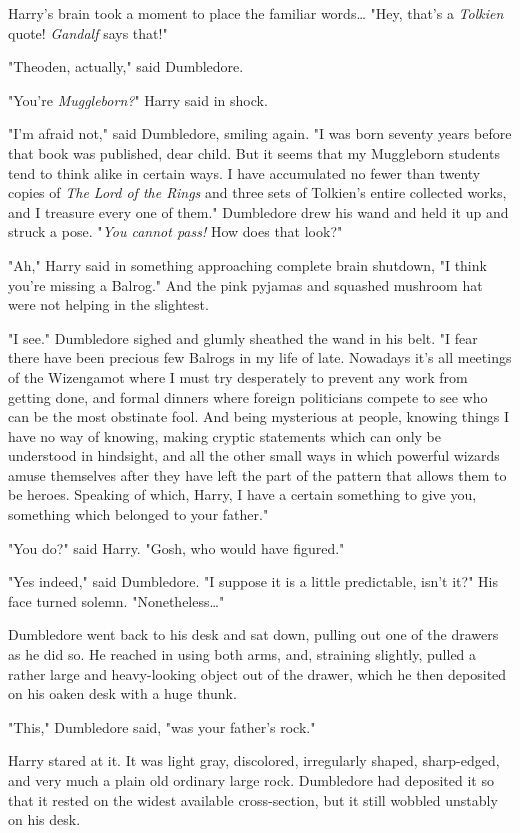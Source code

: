 Harry's brain took a moment to place the familiar words{\ldots} "Hey, that's a 
\emph{Tolkien} quote! \emph{Gandalf} says that!"

"Theoden, actually," said Dumbledore.

"You're \emph{Muggleborn?}" Harry said in shock.

"I'm afraid not," said Dumbledore, smiling again. "I was born seventy years 
before that book was published, dear child. But it seems that my Muggleborn 
students tend to think alike in certain ways. I have accumulated no fewer than 
twenty copies of \emph{The Lord of the Rings} and three sets of Tolkien's 
entire collected works, and I treasure every one of them." Dumbledore drew his 
wand and held it up and struck a pose. "\emph{You cannot pass!} How does that 
look?"

"Ah," Harry said in something approaching complete brain shutdown, "I think 
you're missing a Balrog." And the pink pyjamas and squashed mushroom hat were 
not helping in the slightest.

"I see." Dumbledore sighed and glumly sheathed the wand in his belt. "I fear 
there have been precious few Balrogs in my life of late. Nowadays it's all 
meetings of the Wizengamot where I must try desperately to prevent any work 
from getting done, and formal dinners where foreign politicians compete to see 
who can be the most obstinate fool. And being mysterious at people, knowing 
things I have no way of knowing, making cryptic statements which can only be 
understood in hindsight, and all the other small ways in which powerful wizards 
amuse themselves after they have left the part of the pattern that allows them 
to be heroes. Speaking of which, Harry, I have a certain something to give you, 
something which belonged to your father."

"You do?" said Harry. "Gosh, who would have figured."

"Yes indeed," said Dumbledore. "I suppose it is a little predictable, isn't 
it?" His face turned solemn. "Nonetheless{\ldots}"

Dumbledore went back to his desk and sat down, pulling out one of the drawers 
as he did so. He reached in using both arms, and, straining slightly, pulled a 
rather large and heavy-looking object out of the drawer, which he then 
deposited on his oaken desk with a huge thunk.

"This," Dumbledore said, "was your father's rock."

Harry stared at it. It was light gray, discolored, irregularly shaped, 
sharp-edged, and very much a plain old ordinary large rock. Dumbledore had 
deposited it so that it rested on the widest available cross-section, but it 
still wobbled unstably on his desk.

